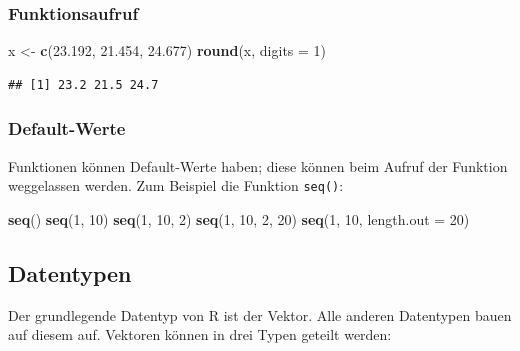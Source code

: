 \documentclass[
]{article}
\newenvironment{Shaded}{\begin{snugshade}}{\end{snugshade}}
\newcommand{\AttributeTok}[1]{\textcolor[rgb]{0.13,0.29,0.53}{#1}}
\newcommand{\DecValTok}[1]{\textcolor[rgb]{0.00,0.00,0.81}{#1}}
\newcommand{\FloatTok}[1]{\textcolor[rgb]{0.00,0.00,0.81}{#1}}
\newcommand{\FunctionTok}[1]{\textcolor[rgb]{0.13,0.29,0.53}{\textbf{#1}}}
\newcommand{\NormalTok}[1]{#1}
\newcommand{\OtherTok}[1]{\textcolor[rgb]{0.56,0.35,0.01}{#1}}
\begin{document}
\hypertarget{funktionsaufruf}{%
\subsubsection{Funktionsaufruf}\label{funktionsaufruf}}

\begin{Shaded}
\begin{Highlighting}[]
\NormalTok{x }\OtherTok{\textless{}{-}} \FunctionTok{c}\NormalTok{(}\FloatTok{23.192}\NormalTok{, }\FloatTok{21.454}\NormalTok{, }\FloatTok{24.677}\NormalTok{)}
\FunctionTok{round}\NormalTok{(x, }\AttributeTok{digits =} \DecValTok{1}\NormalTok{)}
\end{Highlighting}
\end{Shaded}

\begin{verbatim}
## [1] 23.2 21.5 24.7
\end{verbatim}

\hypertarget{default-werte}{%
\subsubsection{Default-Werte}\label{default-werte}}

Funktionen können Default-Werte haben; diese können beim Aufruf der
Funktion weggelassen werden. Zum Beispiel die Funktion \texttt{seq()}:

\begin{Shaded}
\begin{Highlighting}[]
\FunctionTok{seq}\NormalTok{()}
\FunctionTok{seq}\NormalTok{(}\DecValTok{1}\NormalTok{, }\DecValTok{10}\NormalTok{)}
\FunctionTok{seq}\NormalTok{(}\DecValTok{1}\NormalTok{, }\DecValTok{10}\NormalTok{, }\DecValTok{2}\NormalTok{)}
\FunctionTok{seq}\NormalTok{(}\DecValTok{1}\NormalTok{, }\DecValTok{10}\NormalTok{, }\DecValTok{2}\NormalTok{, }\DecValTok{20}\NormalTok{)}
\FunctionTok{seq}\NormalTok{(}\DecValTok{1}\NormalTok{, }\DecValTok{10}\NormalTok{, }\AttributeTok{length.out =} \DecValTok{20}\NormalTok{)}
\end{Highlighting}
\end{Shaded}

\hypertarget{datentypen}{%
\subsection{Datentypen}\label{datentypen}}

Der grundlegende Datentyp von R ist der Vektor. Alle anderen Datentypen
bauen auf diesem auf. Vektoren können in drei Typen geteilt werden:
\end{document}
